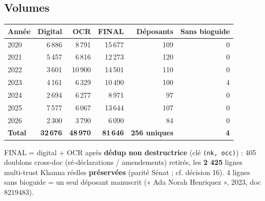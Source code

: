 \documentclass[11pt,a4paper]{article}
\begin{document}
\subsection{Volumes}
\begin{center}\small
\begin{tabular}{@{}lrrrrr@{}}
\toprule
\textbf{Année} & \textbf{Digital} & \textbf{OCR} & \textbf{FINAL} & \textbf{Déposants} & \textbf{Sans bioguide} \\
\midrule
2020 & 6\,886 & 8\,791 & 15\,677 & 109 & 0 \\
2021 & 5\,457 & 6\,816 & 12\,273 & 120 & 0 \\
2022 & 3\,601 & 10\,900 & 14\,501 & 110 & 0 \\
2023 & 4\,161 & 6\,329 & 10\,490 & 100 & 4 \\
2024 & 2\,694 & 6\,277 & 8\,971 & 97 & 0 \\
2025 & 7\,577 & 6\,067 & 13\,644 & 107 & 0 \\
2026 & 2\,300 & 3\,790 & 6\,090 & 84 & 0 \\
\midrule
\textbf{Total} & \textbf{32\,676} & \textbf{48\,970} & \textbf{81\,646} & \textbf{256 uniques} & \textbf{4} \\
\bottomrule
\end{tabular}
\end{center}
FINAL = digital + OCR après \textbf{dédup non destructrice} (clé \texttt{(nk, occ)}) : 405 doublons
cross-doc (ré-déclarations / amendements) retirés, les \textbf{2 425} lignes multi-trust Khanna réelles
\textbf{préservées} (parité Sénat ; cf. décision 16). 4 lignes sans bioguide = un seul déposant
manuscrit (« Ada Norah Henriquez », 2023, doc 8219483).
\end{document}
